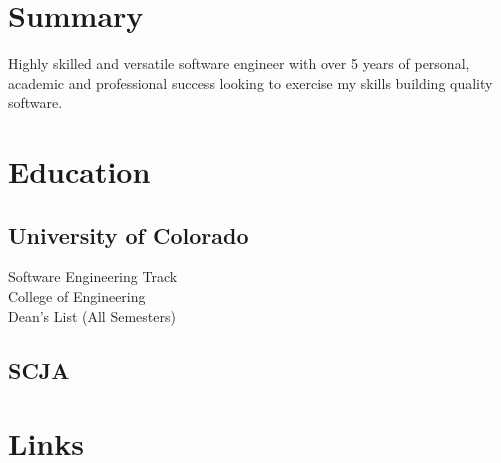 \documentclass[letterpaper]{deedy-resume} %
\begin{document}
\begin{minipage}[t]{0.33\textwidth} %
\section{Summary}
\raggedright
Highly skilled and versatile software engineer with over 5 years of personal,
academic and professional success looking to exercise my skills building quality
software.



\section{Education} 

\subsection{University of Colorado}

\sectionspace %

Software Engineering Track \\
College of Engineering \\
Dean's List (All Semesters) \\

\sectionspace %

\raggedright 
\subsection{SCJA}


\sectionspace %


\section{Links} 



\end{minipage}
\end{document}
